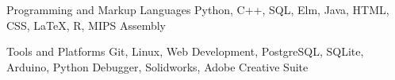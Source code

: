 

\begin{cvskills}

  \cvskill
    {Programming and Markup Languages} %
    {Python, C++, SQL, Elm, Java, HTML, CSS, LaTeX, R, MIPS Assembly} %

  \cvskill
    {Tools and Platforms} %
    {Git, Linux, Web Development, PostgreSQL, SQLite, Arduino, Python Debugger, Solidworks, Adobe Creative Suite} %

\end{cvskills}
